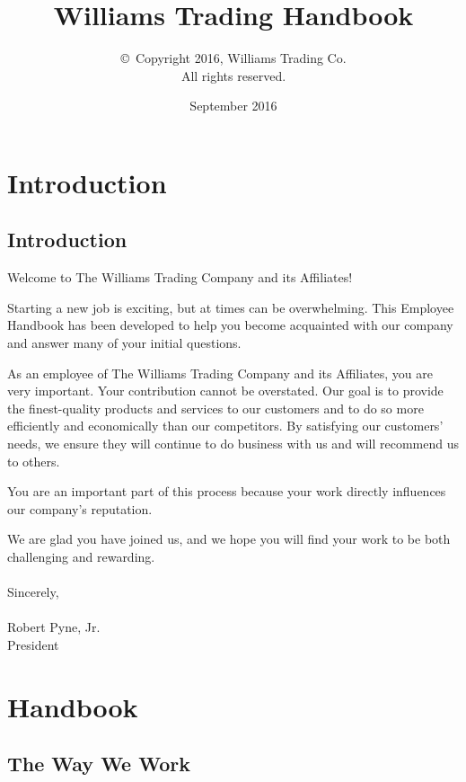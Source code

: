 \documentclass{book}
\title{Williams Trading Handbook}
\author{\copyright~Copyright 2016, Williams Trading Co.\\
 All rights reserved.}
\date{September 2016}
\begin{document}
\maketitle

\clearpage
{}
\tableofcontents

\setlength{\parindent}{0pt}
\setlength{\parskip}{1em}

\clearpage
{}

\chapter{Introduction}

\section{Introduction}

Welcome to The Williams Trading Company and its Affiliates!

Starting a new job is exciting, but at times can be overwhelming. This Employee Handbook has been developed to help you become acquainted with our company and answer many of your initial questions.

As an employee of The Williams Trading Company and its Affiliates, you are very important. Your contribution cannot be overstated. Our goal is to provide the finest-quality products and services to our customers and to do so more efficiently and economically than our competitors. By satisfying our customers' needs, we ensure they will continue to do business with us and will recommend us to others.

You are an important part of this process because your work directly influences our company's reputation.

We are glad you have joined us, and we hope you will find your work to be both challenging and rewarding.
\\
\\
Sincerely,
\\
\\
Robert Pyne, Jr.\\
President

\chapter{Handbook}

\section{The Way We Work}
\end{document}
